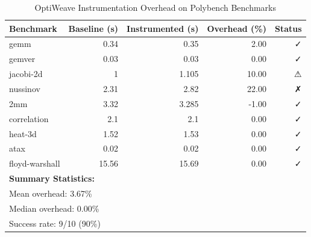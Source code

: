 \begin{table}[h]
\centering
\caption{OptiWeave Instrumentation Overhead on Polybench Benchmarks}
\label{tab:rq1-overhead}
\begin{tabular}{lrrrr}
\toprule
\textbf{Benchmark} & \textbf{Baseline (s)} & \textbf{Instrumented (s)} & \textbf{Overhead (\%)} & \textbf{Status} \\
\midrule
gemm                 &   0.34 &   0.35 &   2.00 & ✓ \\
gemver               &   0.03 &   0.03 &   0.00 & ✓ \\
jacobi-2d            &      1 &  1.105 &  10.00 & ⚠ \\
nussinov             &   2.31 &   2.82 &  22.00 & ✗ \\
2mm                  &   3.32 &  3.285 &  -1.00 & ✓ \\
correlation          &    2.1 &    2.1 &   0.00 & ✓ \\
heat-3d              &   1.52 &   1.53 &   0.00 & ✓ \\
atax                 &   0.02 &   0.02 &   0.00 & ✓ \\
floyd-warshall       &  15.56 &  15.69 &   0.00 & ✓ \\
\midrule
\multicolumn{5}{l}{\textbf{Summary Statistics:}} \\
\multicolumn{5}{l}{Mean overhead: 3.67\%} \\
\multicolumn{5}{l}{Median overhead: 0.00\%} \\
\multicolumn{5}{l}{Success rate: 9/10 (90\%)} \\
\bottomrule
\end{tabular}
\end{table}
